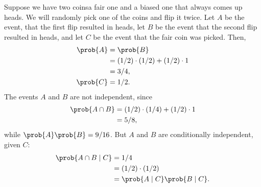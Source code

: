 Suppose we have two coins\dash a fair one and a biased one that always comes up heads.
We will randomly pick one of the coins and flip it twice.
Let $A$ be the event, that the first flip resulted in heads, let $B$ be the event that the second flip resulted in heads, and let $C$ be the event that the fair coin was picked.
Then,
\begin{align*}
    \prob{A} &= \prob{B} \\
    &= (1/2)\cdot(1/2)+(1/2)\cdot1 \\
    &= 3/4, \\
    \prob{C} &= 1/2.
\end{align*}
The events $A$ and $B$ are not independent, since
\begin{align*}
    \prob{A\cap B} &= (1/2)\cdot(1/4)+(1/2)\cdot1 \\
    &= 5/8,
\end{align*}
while $\prob{A}\prob{B}=9/16$.
But $A$ and $B$ are conditionally independent, given $C$:
\begin{align*}
    \prob{A\cap B\mid C} &= 1/4 \\
    &= (1/2)\cdot(1/2) \\
    &= \prob{A\mid C}\prob{B\mid C}.
\end{align*}
